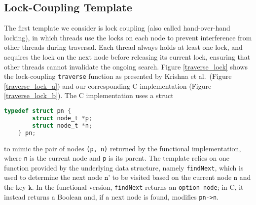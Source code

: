 \documentclass[sigplan,screen]{acmart}
\begin{document}
{\subsection{Lock-Coupling Template}
\label{lock-coupling-algo}

The first template we consider is lock coupling (also called hand-over-hand locking), in which threads use the locks on each node to prevent interference from other threads during traversal. Each thread always holds at least one lock, and acquires the lock on the next node before releasing its current lock, ensuring that other threads cannot invalidate the ongoing search.
Figure \ref{traverse_lock} shows the lock-coupling \lstinline{traverse} function as presented by Krishna et al.~(Figure \ref{traverse_lock_a}) and our corresponding C implementation (Figure \ref{traverse_lock_b}). The C implementation uses a struct
\begin{lstlisting}[style=myStyle, language = C, backgroundcolor=\color{white}, basicstyle=\ttfamily\footnotesize, numbers=none, xleftmargin=0.5em]
	typedef struct pn {
		struct node_t *p; 
		struct node_t *n;
	} pn;
\end{lstlisting}
to mimic the pair of nodes \lstinline{(p, n)} returned by the functional implementation, where \lstinline{n} is the current node and \lstinline{p} is its parent. The template relies on one function provided by the underlying data structure, namely \lstinline{findNext}, which is used to determine the next node $\texttt{n'}$ to be visited based on the current node $\texttt{n}$ and the key $\texttt{k}$. In the functional version, \lstinline{findNext} returns an \lstinline{option node}; in C, it instead returns a Boolean and, if a next node is found, modifies \lstinline{pn->n}.


}
\end{document}
